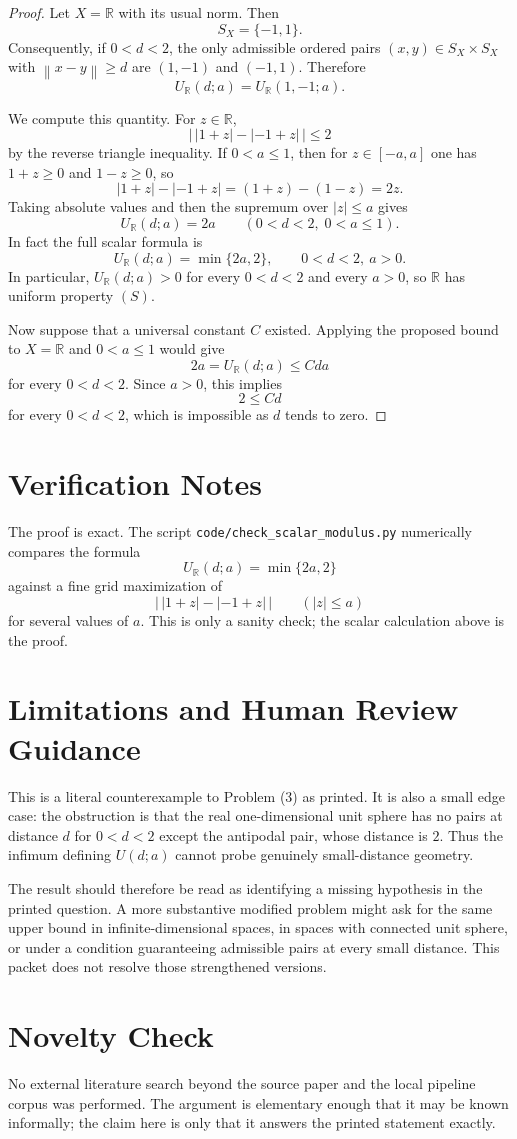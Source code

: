 \documentclass[11pt]{article}
\newcommand{\norm}[1]{\left\lVert #1 \right\rVert}
\newcommand{\R}{\mathbb{R}}
\begin{document}
\begin{proof}
Let $X=\R$ with its usual norm. Then
\[
  S_X=\{-1,1\}.
\]
Consequently, if $0<d<2$, the only admissible ordered pairs
$(x,y)\in S_X\times S_X$ with $\norm{x-y}\ge d$ are $(1,-1)$ and
$(-1,1)$. Therefore
\[
  U_{\R}(d;a)=U_{\R}(1,-1;a).
\]

We compute this quantity. For $z\in\R$,
\[
  \left|\,|1+z|-|-1+z|\,\right|\le 2
\]
by the reverse triangle inequality. If $0<a\le 1$, then for
$z\in[-a,a]$ one has $1+z\ge 0$ and $1-z\ge 0$, so
\[
  |1+z|-|-1+z|
  =
  (1+z)-(1-z)
  =
  2z.
\]
Taking absolute values and then the supremum over $|z|\le a$ gives
\[
  U_{\R}(d;a)=2a
  \qquad (0<d<2,\; 0<a\le 1).
\]
In fact the full scalar formula is
\[
  U_{\R}(d;a)=\min\{2a,2\},
  \qquad 0<d<2,\ a>0.
\]
In particular, $U_{\R}(d;a)>0$ for every $0<d<2$ and every $a>0$, so
$\R$ has uniform property $(S)$.

Now suppose that a universal constant $C$ existed. Applying the proposed
bound to $X=\R$ and $0<a\le 1$ would give
\[
  2a=U_{\R}(d;a)\le Cda
\]
for every $0<d<2$. Since $a>0$, this implies
\[
  2\le Cd
\]
for every $0<d<2$, which is impossible as $d$ tends to zero.
\end{proof}

\section*{Verification Notes}

The proof is exact. The script
\texttt{code/check\_scalar\_modulus.py} numerically compares the formula
\[
  U_{\R}(d;a)=\min\{2a,2\}
\]
against a fine grid maximization of
\[
  \left|\,|1+z|-|-1+z|\,\right|
  \qquad (|z|\le a)
\]
for several values of $a$. This is only a sanity check; the scalar
calculation above is the proof.

\section*{Limitations and Human Review Guidance}

This is a literal counterexample to Problem (3) as printed. It is also a
small edge case: the obstruction is that the real one-dimensional unit
sphere has no pairs at distance $d$ for $0<d<2$ except the antipodal
pair, whose distance is $2$. Thus the infimum defining $U(d;a)$ cannot
probe genuinely small-distance geometry.

The result should therefore be read as identifying a missing hypothesis
in the printed question. A more substantive modified problem might ask
for the same upper bound in infinite-dimensional spaces, in spaces with
connected unit sphere, or under a condition guaranteeing admissible
pairs at every small distance. This packet does not resolve those
strengthened versions.

\section*{Novelty Check}

No external literature search beyond the source paper and the local
pipeline corpus was performed. The argument is elementary enough that it
may be known informally; the claim here is only that it answers the
printed statement exactly.
\end{document}
